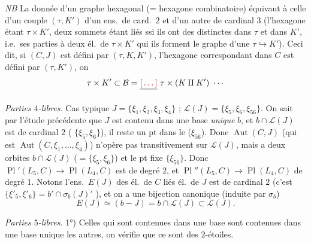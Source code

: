 \documentclass[11pt,a4paper]{article}
\begin{document}

\emph{NB} La donnée d'un graphe hexagonal (= hexagone combinatoire) équivaut à celle d'un couple \struck{\ill{}} $(\tau,K')$ d'un ens.\ de card.\ $2$ et d'un autre de cardinal $3$ (l'hexagone étant $\tau\times K'$, deux sommets étant liés ssi ils \struck{\ill{}} ont des \struck{\ill{}}  distinctes dans $\tau$ et dans $K'$, i.e.\ ses \struck{\ill{}} parties à deux él.\ de $\tau\times K'$ qui ils forment  le graphe d'une  $\tau\hookrightarrow K'$). Ceci dit, si $(C,J)$ est défini par $(\tau,K,K')$, l'hexagone correspondant dans $C$ est défini par $(\tau,K')$, on \ill{}
\[
\tau\times K'\subset\mathcal{B}=\struck{\ill{}}\ \tau\times(K\amalg K')\ \cdots
\]

\emph{Parties $4$-libres.} Cas typique $J=\lbrace\xi_1,\xi_2,\xi_3,\xi_4\rbrace$ ; $\mathcal{L}(J)=\lbrace\xi_5,\xi_6,\xi_{56}\rbrace$. On sait par l'étude précédente que $J$ est contenu dans une base \emph{unique} $b$, et $b\cap\mathcal{L}(J)$ est  de cardinal $2$ ( $\lbrace\xi_5,\xi_6\rbrace$), il reste un pt dans le  ($\xi_{56}$). Donc $\operatorname{Aut}(C,J)$ (qui est  \ill{} $\operatorname{Aut}(C,\xi_1,\ldots,\xi_4)$) n'opère pas transitivement sur $\mathcal{L}(J)$, mais  a deux orbites $b\cap\mathcal{L}(J)$ ($=\lbrace\xi_5,\xi_6\rbrace$) et le pt fixe $\lbrace\xi_{56}\rbrace$. Donc $\operatorname{Pl}'(L_5,C)\to\operatorname{Pl}(L_4,C)$ est de degré $2$, et $\operatorname{Pl}''(L_5,C)\to\operatorname{Pl}(L_4,C)$ de degré $1$. Notons \ill{} l'ens.\ $E(J)$ des él.\ de $C$ liés \ill{} él.\ de $J$ est de cardinal $2$ (c'est $\lbrace\xi'_5,\xi'_6\rbrace=b'\cap\sigma_b(J)'$ \struck{\ill{}}), et on a une bijection canonique (induite par $\sigma_b$)
\[
E(J)\simeq(b-J)=b\cap\mathcal{L}(J)\subset\mathcal{L}(J).
\]

\emph{Parties $5$-libres.} 1°) Celles qui sont contenues dans une base sont contenues dans une base unique\struck{\ill{}} les autres, on vérifie que ce sont des $2$-étoiles.
\end{document}
